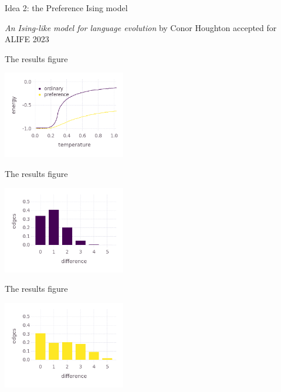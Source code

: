 \documentclass{beamer}
\begin{document}
\begin{frame}{Idea 2: the Preference Ising model}
  \begin{minipage}[t][.7\textheight]{\textwidth}
    \vskip 1cm
\textsl{An Ising-like model for language evolution} by Conor Houghton accepted for ALIFE 2023
\end{minipage}
\end{frame}

\begin{frame}{The results figure}
  \begin{minipage}[t][.7\textheight]{\textwidth}
    \vskip 1cm
\begin{center}
\includegraphics[height=1.5in]{energy.png}
\end{center}
  \end{minipage}
  \end{frame}


\begin{frame}{The results figure}
  \begin{minipage}[t][.7\textheight]{\textwidth}
    \vskip 1cm
\begin{center}
\includegraphics[height=1.5in]{ord_hist.png}
\end{center}
  \end{minipage}
  \end{frame}


\begin{frame}{The results figure}
  \begin{minipage}[t][.7\textheight]{\textwidth}
    \vskip 1cm
\begin{center}
\includegraphics[height=1.5in]{evo_hist.png}
\end{center}
  \end{minipage}
  \end{frame}
\end{document}
